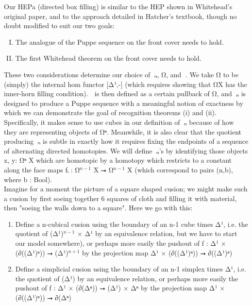 \documentclass{book}
\theoremstyle{definition}
\begin{document}
Our HEPa (directed box filling) is similar to the HEP shown in Whitehead's original paper, and to the approach detailed in Hatcher's textbook, though no doubt modified to suit our two goals:

\begin{enumerate}[(I)]
\item The analogue of the Puppe sequence on the front cover needs to hold.
\item The first Whitehead theorem on the front cover needs to hold.
\end{enumerate}

These two considerations determine our choice of π⃗ₙ, Ω⃗, and ω⃗. We take Ω⃗ to be (simply) the internal hom functor [Δ¹,-] (which requires showing that Ω⃗X has the inner-horn filling condition). ω⃗ is then defined as a certain pullback of Ω⃗, and π⃗ₙ is designed to produce a Puppe sequence with a meaningful notion of exactness by which we can demonstrate the goal of recognition theorems (i) and (ii). Specifically, it makes sense to use cubes in our definition of π⃗ₙ because of how they are representing objects of Ω⃗ⁿ. Meanwhile, it is also clear that the quotient producing π⃗ₙ is subtle in exactly how it requires fixing the endpoints of a sequence of alternating directed homotopies. We will define π⃗ₙ's by identifying those objects x, y: Ω⃗ⁿ X which are homotopic by a homotopy which restricts to a constant along the face maps fᵢ : Ω⃗${}^{n-1}$ X ⭢ Ω⃗${}^{n-1}$ X (which correspond to pairs (n,b), where b : Bool).\\

Imagine for a moment the picture of a square shaped cusion; we might make such a cusion by first soeing together 6 squares of cloth and filling it with material, then "soeing the walls down to a square". Here we go with this:

\begin{enumerate}
\item Define a n-cubical cusion using the boundary of an n-1 cube times Δ¹, i.e. the quotient of (Δ¹)${}^{n-1}$ × Δ¹ by an equivalence relation, but we have to start our model somewhere), or perhaps more easily the pushout of f : Δ¹ × (∂((Δ¹)ⁿ)) ⭢ (Δ¹)${}^{n+1}$ by the projection map Δ¹ × (∂((Δ¹)ⁿ)) ⭢ ∂((Δ¹)ⁿ)
\item Define a simplicial cusion using the boundary of an n-1 simplex times Δ¹, i.e. the quotient of (Δ¹) by an equivalence relation, or perhaps more easily the pushout of f : Δ¹ × (∂(Δⁿ)) ⭢ (Δ¹) × Δⁿ by the projection map Δ¹ × (∂((Δ¹)ⁿ)) ⭢ ∂(Δⁿ)
\end{enumerate}
\end{document}
